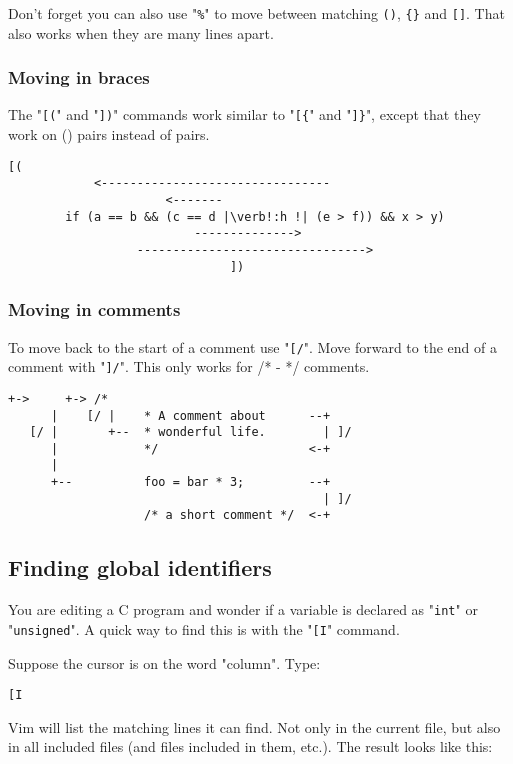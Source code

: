 Don't forget you can also use "\verb!%!" to move between matching \verb!()!, \verb!{}! and \verb![]!.
That also works when they are many lines apart.
\subsubsection{Moving in braces}
The "\verb![(!" and "\verb!])!" commands work similar to "\verb![{!" and "\verb!]}!", except that they work on () pairs instead of {} pairs.

\begin{Verbatim}[samepage=true]
                          [(
            <--------------------------------
                      <-------
        if (a == b && (c == d |\verb!:h !| (e > f)) && x > y) 
                          -------------->
                  -------------------------------->
                               ])
\end{Verbatim}

\subsubsection{Moving in comments}
To move back to the start of a comment use "\verb![/!".
Move forward to the end of a comment with "\verb!]/!".
This only works for /* - */ comments.

\begin{Verbatim}[samepage=true]
      +->     +-> /*
      |    [/ |    * A comment about      --+
   [/ |       +--  * wonderful life.        | ]/
      |            */                     <-+
      |
      +--          foo = bar * 3;         --+
                                            | ]/
                   /* a short comment */  <-+
\end{Verbatim}
\subsection{Finding global identifiers}
You are editing a C program and wonder if a variable is declared as "\verb!int!" or "\verb!unsigned!".
A quick way to find this is with the "\verb![I!" command.

Suppose the cursor is on the word "column".
Type:

\begin{Verbatim}[samepage=true]
 [I
\end{Verbatim}

Vim will list the matching lines it can find.
Not only in the current file, but also in all included files (and files included in them, etc.).
The result looks like this:

